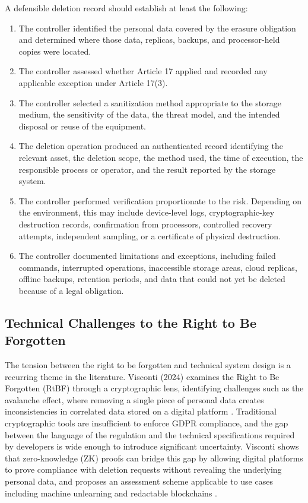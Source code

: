 A defensible deletion record should establish at least the following:
\begin{enumerate}
\item The controller identified the personal data covered by the erasure obligation and determined where those data, replicas, backups, and 
processor-held copies were located.

\item The controller assessed whether Article 17 applied and recorded any applicable exception under Article 17(3).

\item The controller selected a sanitization method appropriate to the storage medium, the sensitivity of the data, the threat model, and 
the intended disposal or reuse of the equipment.

\item The deletion operation produced an authenticated record identifying the relevant asset, the deletion scope, the method used, the time 
of execution, the responsible process or operator, and the result reported by the storage system.

\item The controller performed verification proportionate to the risk. Depending on the environment, this may include device-level logs, 
cryptographic-key destruction records, confirmation from processors, controlled recovery attempts, independent sampling, or a certificate 
of physical destruction.

\item The controller documented limitations and exceptions, including failed commands, interrupted operations, inaccessible storage areas, 
cloud replicas, offline backups, retention periods, and data that could not yet be deleted because of a legal obligation.

\end{enumerate}

\subsection{Technical Challenges to the Right to Be Forgotten}
The tension between the right to be forgotten and technical system design is a recurring theme in 
the literature. Visconti (2024) examines the Right to Be Forgotten (RtBF) through a cryptographic 
lens, identifying challenges such as the avalanche effect, where removing a single piece of 
personal data creates inconsistencies in correlated data stored on a digital platform \cite{Visconti2024zeroknowledge}.
Traditional cryptographic tools are insufficient to enforce GDPR compliance, and the gap between 
the language of the regulation and the technical specifications required by developers is wide 
enough to introduce significant uncertainty. Visconti shows that zero-knowledge (ZK) proofs can 
bridge this gap by allowing digital platforms to prove compliance with deletion requests without 
revealing the underlying personal data, and proposes an assessment scheme applicable to use cases 
including machine unlearning and redactable blockchains \cite{Visconti2024zeroknowledge}.

